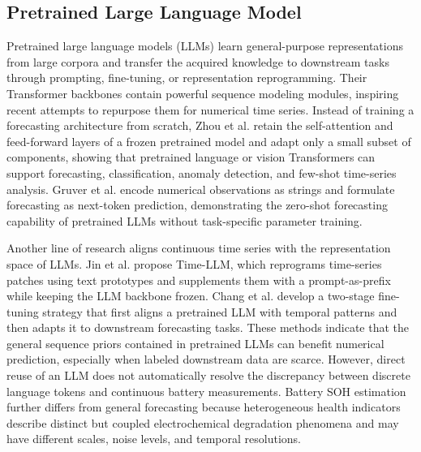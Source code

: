 \documentclass[preprint,12pt]{elsarticle}
\begin{document}
\subsection{Pretrained Large Language Model}

Pretrained large language models (LLMs) learn general-purpose representations from large corpora and transfer the acquired knowledge to downstream tasks through prompting, fine-tuning, or representation reprogramming. Their Transformer backbones contain powerful sequence modeling modules, inspiring recent attempts to repurpose them for numerical time series. Instead of training a forecasting architecture from scratch, Zhou et al. \cite{zhou2023one} retain the self-attention and feed-forward layers of a frozen pretrained model and adapt only a small subset of components, showing that pretrained language or vision Transformers can support forecasting, classification, anomaly detection, and few-shot time-series analysis. Gruver et al. \cite{gruver2023large} encode numerical observations as strings and formulate forecasting as next-token prediction, demonstrating the zero-shot forecasting capability of pretrained LLMs without task-specific parameter training.

Another line of research aligns continuous time series with the representation space of LLMs. Jin et al. \cite{jin2024timellm} propose Time-LLM, which reprograms time-series patches using text prototypes and supplements them with a prompt-as-prefix while keeping the LLM backbone frozen. Chang et al. \cite{chang2023llm4ts} develop a two-stage fine-tuning strategy that first aligns a pretrained LLM with temporal patterns and then adapts it to downstream forecasting tasks. 
These methods indicate that the general sequence priors contained in pretrained LLMs can benefit numerical prediction, especially when labeled downstream data are scarce. However, direct reuse of an LLM does not automatically resolve the discrepancy between discrete language tokens and continuous battery measurements. Battery SOH estimation further differs from general forecasting because heterogeneous health indicators describe distinct but coupled electrochemical degradation phenomena and may have different scales, noise levels, and temporal resolutions.

\end{document}
